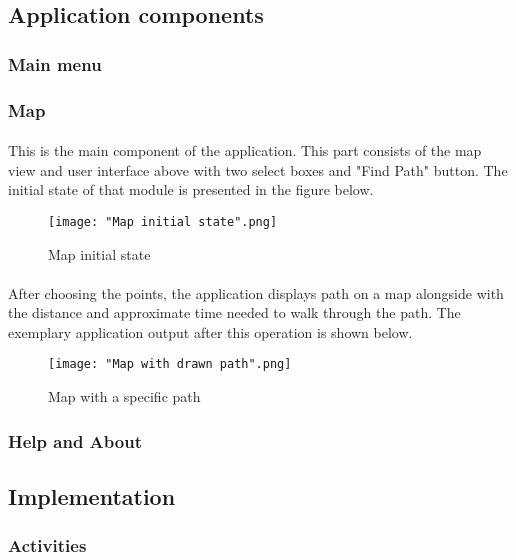 \documentclass[12pt]{article}
\begin{document}
\subsection{Application components}
\subsubsection{Main menu}
\subsubsection{Map}
\paragraph{} This is the main component of the application. This part consists of the map view and user interface above with two select boxes and "Find Path" button. The initial state of that module is presented in the figure below.

\begin{figure}[H]
\centerline{\texttt{[image: "Map initial state".png]}}
\caption{Map initial state}
\label{fig:MapInitial}
\end{figure}

\paragraph{} After choosing the points, the application displays path on a map alongside with the distance and approximate time needed to walk through the path. The exemplary application output after this operation is shown below.

\begin{figure}[H]
\centerline{\texttt{[image: "Map with drawn path".png]}}
\caption{Map with a specific path}
\label{fig:MapPath}
\end{figure}
 
\subsubsection{Help and About}

\subsection{Implementation}
\subsubsection{Activities}
\end{document}
